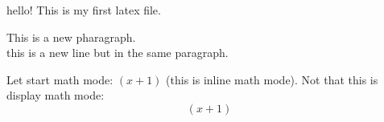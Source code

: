 \documentclass[11pt]{article}
\begin{document}
hello!
This is my first latex file.

This is a new pharagraph.\\this is a new line but in the same paragraph.

Let start math mode: $(x+1)$ (this is inline math mode).
Not that this is display math mode: $$(x+1)$$
\end{document}
